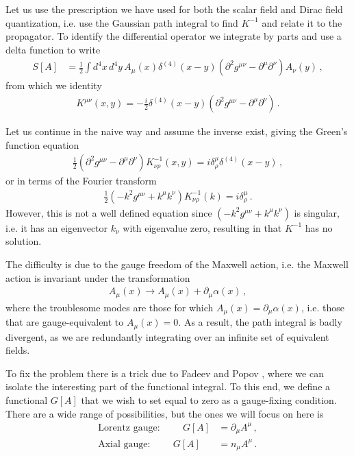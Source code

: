 Let us use the prescription we have used for both the scalar field and Dirac field quantization, i.e. use the Gaussian path integral to find $K^{-1}$ and relate it to the propagator. To identify the differential operator we integrate by parts and use a delta function to write
\begin{align}
    S[A]&=\frac{1}{2}\int d^{4}x\,d^{4}y\,A_{\mu}(x)\delta^{(4)}(x-y)(\partial^{2}g^{\mu\nu}-\partial^{\mu}\partial^{\nu})A_{\nu}(y)\,,
\end{align}
from which we identity
\begin{align}
    K^{\mu\nu}(x,y)=-\frac{i}{2}\delta^{(4)}(x-y)(\partial^{2}g^{\mu\nu}-\partial^{\mu}\partial^{\nu})\,.
\end{align}

Let us continue in the naive way and assume the inverse exist, giving the Green's function equation
\begin{align}
    \frac{1}{2}(\partial^{2}g^{\mu\nu}-\partial^{\mu}\partial^{\nu})K_{\nu\rho}^{-1}(x,y)=i\delta_{\rho}^{\mu}\delta^{(4)}(x-y)\,,
\end{align}
or in terms of the Fourier transform
\begin{align}
    \frac{1}{2}(-k^{2}g^{\mu\nu}+k^{\mu}k^{\nu})K_{\nu\rho}^{-1}(k)=i\delta_{\rho}^{\mu}\,.
\end{align}
However, this is not a well defined equation since $(-k^{2}g^{\mu\nu}+k^{\mu}k^{\nu})$ is singular, i.e. it has an eigenvector $k_{\nu}$ with eigenvalue zero, resulting in that $K^{-1}$ has no solution.

The difficulty is due to the gauge freedom of the Maxwell action, i.e. the Maxwell action is invariant under the transformation
\begin{align}
    A_{\mu}(x)\rightarrow A_{\mu}(x)+\partial_{\mu}\alpha(x)\,,
\end{align}
where the troublesome modes are those for which $A_{\mu}(x)=\partial_{\mu}\alpha(x)$, i.e. those that are gauge-equivalent to $A_{\mu}(x)=0$. As a result, the path integral is badly divergent, as we are redundantly integrating over an infinite set of equivalent fields.

To fix the problem there is a trick due to Fadeev and Popov \cite{Faddeev:1967fc}, where we can isolate the interesting part of the functional integral. To this end, we define a functional $G[A]$ that we wish to set equal to zero as a gauge-fixing condition. There are a wide range of possibilities, but the ones we will focus on here is 
\begin{align}
    \text{Lorentz gauge:}\hspace{1cm}G[A]&=\partial_{\mu}A^{\mu}\,,
    \\
    \text{Axial gauge:}\hspace{1cm}G[A]&=n_{\mu}A^{\mu}\,.
\end{align}

